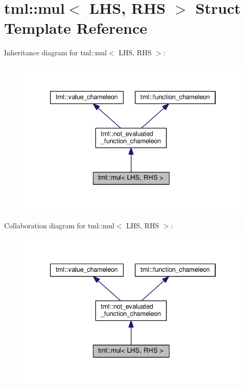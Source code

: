 \hypertarget{structtml_1_1mul}{\section{tml\+:\+:mul$<$ L\+H\+S, R\+H\+S $>$ Struct Template Reference}
\label{structtml_1_1mul}
}


Inheritance diagram for tml\+:\+:mul$<$ L\+H\+S, R\+H\+S $>$\+:
\nopagebreak
\begin{figure}[H]
\begin{center}
\leavevmode
\includegraphics[width=333pt]{structtml_1_1mul__inherit__graph}
\end{center}
\end{figure}


Collaboration diagram for tml\+:\+:mul$<$ L\+H\+S, R\+H\+S $>$\+:
\nopagebreak
\begin{figure}[H]
\begin{center}
\leavevmode
\includegraphics[width=333pt]{structtml_1_1mul__coll__graph}
\end{center}
\end{figure}
